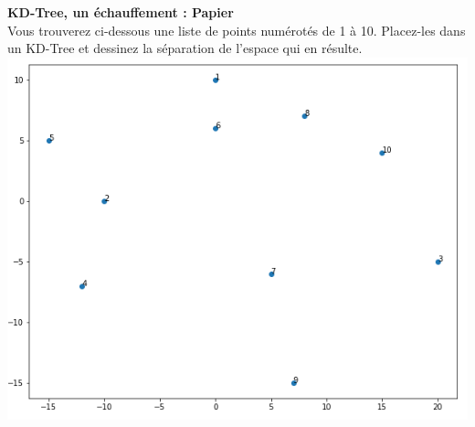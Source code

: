 \begin{Exercice}[5 minutes]\textbf{KD-Tree, un échauffement : Papier}\\
Vous trouverez ci-dessous une liste de points numérotés de 1 à 10. Placez-les dans un KD-Tree et dessinez la séparation de l'espace qui en résulte.\\

\includegraphics[]{resources/KD_points.PNG}


\end{Exercice}
